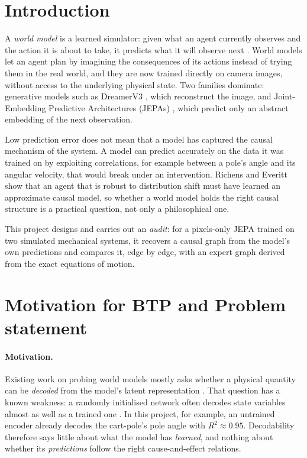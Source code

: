 \documentclass[11pt, a4paper, oneside,enumerate,textcomp]{report}
\newcommand{\Rsq}{R^2}
\begin{document}
\section{Introduction}

A \emph{world model} is a learned simulator: given what an agent currently observes and the action it is about to take, it predicts what it will observe next \cite{ha2018world,lecun2022path}. World models let an agent plan by imagining the consequences of its actions instead of trying them in the real world, and they are now trained directly on camera images, without access to the underlying physical state. Two families dominate: generative models such as DreamerV3 \cite{hafner2025dreamerv3}, which reconstruct the image, and Joint-Embedding Predictive Architectures (JEPAs) \cite{lecun2022path,assran2023ijepa}, which predict only an abstract embedding of the next observation.

Low prediction error does not mean that a model has captured the causal mechanism of the system. A model can predict accurately on the data it was trained on by exploiting correlations, for example between a pole's angle and its angular velocity, that would break under an intervention. Richens and Everitt \cite{richens2024robust} show that an agent that is robust to distribution shift must have learned an approximate causal model, so whether a world model holds the right causal structure is a practical question, not only a philosophical one.

This project designs and carries out an \emph{audit}: for a pixels-only JEPA trained on two simulated mechanical systems, it recovers a causal graph from the model's own predictions and compares it, edge by edge, with an expert graph derived from the exact equations of motion.

\section{Motivation for BTP and Problem statement}

\paragraph{Motivation.} Existing work on probing world models mostly asks whether a physical quantity can be \emph{decoded} from the model's latent representation \cite{li2023othello,garrido2025intuitive,joseph2026interpreting}. That question has a known weakness: a randomly initialised network often decodes state variables almost as well as a trained one \cite{hewitt2019control,bao2026correcting,tan2026latent}. In this project, for example, an untrained encoder already decodes the cart-pole's pole angle with $\Rsq \approx 0.95$. Decodability therefore says little about what the model has \emph{learned}, and nothing about whether its \emph{predictions} follow the right cause-and-effect relations.
\end{document}
